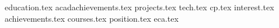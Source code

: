 \documentclass[11pt, a4paper]{awesome-cv}
\newcommand*{\sectiondir}{resume/}
\begin{document}
\makecvheader

{education.tex}
{acadachievements.tex}
{projects.tex}
{tech.tex}
\clearpage
{cp.tex}
{interest.tex}
{achievements.tex}
{courses.tex}
{position.tex}
{eca.tex}
\end{document}
